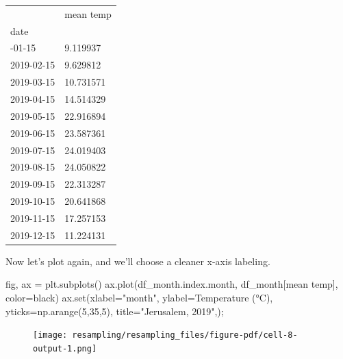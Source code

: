 \documentclass[
  letterpaper,
  DIV=11,
  numbers=noendperiod,
  oneside]{scrreprt}
\newenvironment{Shaded}{\begin{snugshade}}{\end{snugshade}}
\newcommand{\BuiltInTok}[1]{\textcolor[rgb]{0.00,0.23,0.31}{#1}}
\newcommand{\DecValTok}[1]{\textcolor[rgb]{0.68,0.00,0.00}{#1}}
\newcommand{\NormalTok}[1]{\textcolor[rgb]{0.00,0.23,0.31}{#1}}
\newcommand{\OperatorTok}[1]{\textcolor[rgb]{0.37,0.37,0.37}{#1}}
\newcommand{\StringTok}[1]{\textcolor[rgb]{0.13,0.47,0.30}{#1}}
\begin{document}
\begin{longtable}[]{@{}ll@{}}
\toprule\noalign{}
& mean temp \\
date & \\
\midrule\noalign{}
\endhead
\bottomrule\noalign{}
\endlastfoot
2019-01-15 & 9.119937 \\
2019-02-15 & 9.629812 \\
2019-03-15 & 10.731571 \\
2019-04-15 & 14.514329 \\
2019-05-15 & 22.916894 \\
2019-06-15 & 23.587361 \\
2019-07-15 & 24.019403 \\
2019-08-15 & 24.050822 \\
2019-09-15 & 22.313287 \\
2019-10-15 & 20.641868 \\
2019-11-15 & 17.257153 \\
2019-12-15 & 11.224131 \\
\end{longtable}

Now let's plot again, and we'll choose a cleaner x-axis labeling.

\begin{Shaded}
\begin{Highlighting}[]
\NormalTok{fig, ax }\OperatorTok{=}\NormalTok{ plt.subplots()}
\NormalTok{ax.plot(df\_month.index.month, df\_month[}\StringTok{\textquotesingle{}mean temp\textquotesingle{}}\NormalTok{], color}\OperatorTok{=}\StringTok{\textquotesingle{}black\textquotesingle{}}\NormalTok{)}
\NormalTok{ax.}\BuiltInTok{set}\NormalTok{(xlabel}\OperatorTok{=}\StringTok{"month"}\NormalTok{,}
\NormalTok{       ylabel}\OperatorTok{=}\StringTok{\textquotesingle{}Temperature (°C)\textquotesingle{}}\NormalTok{,}
\NormalTok{       yticks}\OperatorTok{=}\NormalTok{np.arange(}\DecValTok{5}\NormalTok{,}\DecValTok{35}\NormalTok{,}\DecValTok{5}\NormalTok{),}
\NormalTok{       title}\OperatorTok{=}\StringTok{"Jerusalem, 2019"}\NormalTok{,)}\OperatorTok{;}
\end{Highlighting}
\end{Shaded}

\begin{figure}[H]

{\centering \texttt{[image: resampling/resampling\_files/figure-pdf/cell-8-output-1.png]}

}

\end{figure}
\end{document}

